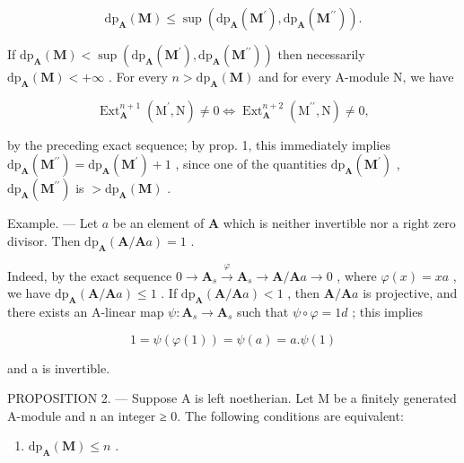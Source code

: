 \[
\mathrm{dp} _ {\mathbf {A}} (\mathbf {M}) \leqslant \sup \left(\mathrm{dp} _ {\mathbf {A}} (\mathbf {M} ^ {\prime}), \mathrm{dp} _ {\mathbf {A}} (\mathbf {M} ^ {\prime \prime})\right).
\]

If \(\mathrm{dp}_{\mathbf{A}}(\mathbf{M}) < \sup (\mathrm{dp}_{\mathbf{A}}(\mathbf{M}^{\prime}),\mathrm{dp}_{\mathbf{A}}(\mathbf{M}^{\prime \prime}))\) then necessarily \(\mathrm{dp}_{\mathbf{A}}(\mathbf{M}) < + \infty\) . For every \(n > \mathrm{dp}_{\mathbf{A}}(\mathbf{M})\) and for every A-module N, we have

\[
\operatorname{Ext} _ {\mathbf {A}} ^ {n + 1} \left(\mathrm{M} ^ {\prime}, \mathrm{N}\right) \neq 0 \Leftrightarrow \operatorname{Ext} _ {\mathbf {A}} ^ {n + 2} \left(\mathrm{M} ^ {\prime \prime}, \mathrm{N}\right) \neq 0,
\]

by the preceding exact sequence; by prop. 1, this immediately implies \(\mathrm{dp}_{\mathbf{A}}(\mathbf{M}^{\prime \prime}) = \mathrm{dp}_{\mathbf{A}}(\mathbf{M}^{\prime}) + 1\) , since one of the quantities \(\mathrm{dp}_{\mathbf{A}}(\mathbf{M}^{\prime})\) , \(\mathrm{dp}_{\mathbf{A}}(\mathbf{M}^{\prime \prime})\) is \(> \mathrm{dp}_{\mathbf{A}}(\mathbf{M})\) .

Example. --- Let \(a\) be an element of \(\mathbf{A}\) which is neither invertible nor a right zero divisor. Then \(\mathrm{dp}_{\mathbf{A}}(\mathbf{A}/\mathbf{A}a)=1\) .

Indeed, by the exact sequence \(0 \to \mathbf{A}_s \xrightarrow{\varphi} \mathbf{A}_s \to \mathbf{A} / \mathbf{A}a \to 0\) , where \(\varphi(x) = xa\) , we have \(\mathrm{dp}_{\mathbf{A}}(\mathbf{A} / \mathbf{A}a) \leqslant 1\) . If \(\mathrm{dp}_{\mathbf{A}}(\mathbf{A} / \mathbf{A}a) < 1\) , then \(\mathbf{A} / \mathbf{A}a\) is projective, and there exists an A-linear map \(\psi : \mathbf{A}_s \to \mathbf{A}_s\) such that \(\psi \circ \varphi = 1d\) ; this implies

\[
1 = \psi (\varphi (1)) = \psi (a) = a. \psi (1)
\]

and a is invertible.

PROPOSITION 2. --- Suppose A is left noetherian. Let M be a finitely generated A-module and n an integer ≥ 0. The following conditions are equivalent:

\begin{enumerate}
\def\labelenumi{(\roman{enumi})}
\tightlist
\item
  \(\mathrm{dp}_{\mathbf{A}}(\mathbf{M}) \leqslant n\) .
\end{enumerate}

